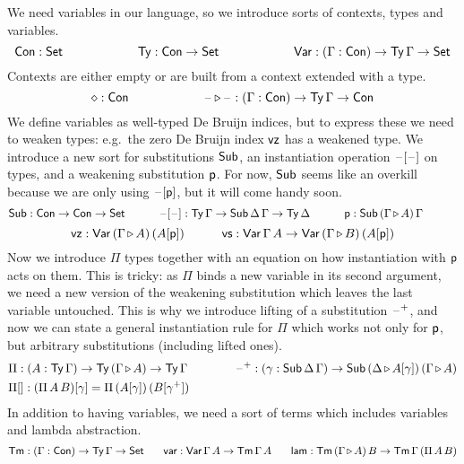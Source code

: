 \documentclass{easychair}
\begin{document}
We need variables in our language, so we introduce sorts of contexts,
types and variables.
\[
 \mathsf{Con} : \mathsf{Set} \hspace{6em} \mathsf{Ty} : \mathsf{Con}\rightarrow\mathsf{Set} \hspace{6em} \mathsf{Var} : (\Gamma:\mathsf{Con})\rightarrow\mathsf{Ty}\,\Gamma\rightarrow\mathsf{Set}  \\
\]
Contexts are either empty or are built from a context extended with a
type.
\[
\diamond : \mathsf{Con} \hspace{6em} \mathord{\hspace{1pt}\text{--}\hspace{1pt}}\mathop{\triangleright}\mathord{\hspace{1pt}\text{--}\hspace{1pt}} : (\Gamma:\mathsf{Con})\rightarrow\mathsf{Ty}\,\Gamma\rightarrow\mathsf{Con}
\]
We define variables as well-typed De Bruijn indices, but to express
these we need to weaken types: e.g.\ the zero De Bruijn index $\mathsf{vz}$
has a weakened type. We introduce a new sort for substitutions $\mathsf{Sub}$,
an instantiation operation $\mathord{\hspace{1pt}\text{--}\hspace{1pt}}[\mathord{\hspace{1pt}\text{--}\hspace{1pt}}]$ on types, and a weakening
substitution $\mathsf{p}$. For now, $\mathsf{Sub}$ seems like an overkill because we
are only using $\mathord{\hspace{1pt}\text{--}\hspace{1pt}}[\mathsf{p}]$, but it will come handy soon.
\[
\mathsf{Sub}: \mathsf{Con}\rightarrow\mathsf{Con}\rightarrow\mathsf{Set} \hspace{3em} \mathord{\hspace{1pt}\text{--}\hspace{1pt}}[\mathord{\hspace{1pt}\text{--}\hspace{1pt}}] : \mathsf{Ty}\,\Gamma\rightarrow\mathsf{Sub}\,\Delta\,\Gamma\rightarrow\mathsf{Ty}\,\Delta \hspace{3em} \mathsf{p} : \mathsf{Sub}\,(\Gamma\mathop{\triangleright} A)\,\Gamma \hspace{3em}
\]
\[
\mathsf{vz} : \mathsf{Var}\,(\Gamma\mathop{\triangleright} A)\,(A[\mathsf{p}]) \hspace{3em} \mathsf{vs} : \mathsf{Var}\,\Gamma\,A\rightarrow\mathsf{Var}\,(\Gamma\mathop{\triangleright} B)\,(A[\mathsf{p}])
\]
Now we introduce $\Pi$ types together with an equation on how
instantiation with $\mathsf{p}$ acts on them. This is tricky: as $\Pi$ binds a
new variable in its second argument, we need a new version of the
weakening substitution which leaves the last variable untouched. This
is why we introduce lifting of a substitution $\mathord{\hspace{1pt}\text{--}\hspace{1pt}}^{+}$, and now we
can state a general instantiation rule for $\Pi$ which works not only
for $\mathsf{p}$, but arbitrary substitutions (including lifted ones).
\begin{alignat*}{10}
& \Pi:(A:\Ty\,\Gamma)\ra\Ty\,(\Gamma\ext A)\ra\Ty\,\Gamma \hspace{3em} && \blank^+ : (\gamma:\Sub\,\Delta\,\Gamma)\ra\Sub\,(\Delta\ext A[\gamma])\,(\Gamma\ext A) \\
& \Pi[] : (\Pi\,A\,B)[\gamma] = \Pi\,(A[\gamma])\,(B[\gamma^+])
\end{alignat*}
In addition to having variables, we need a sort of terms which
includes variables and lambda abstraction.
\[
\mathsf{Tm} : (\Gamma:\mathsf{Con})\rightarrow\mathsf{Ty}\,\Gamma\rightarrow\mathsf{Set} \hspace{1.8em} \mathsf{var} : \mathsf{Var}\,\Gamma\,A\rightarrow\mathsf{Tm}\,\Gamma\,A \hspace{1.8em} \mathsf{lam} : \mathsf{Tm}\,(\Gamma\mathop{\triangleright} A)\,B\rightarrow\mathsf{Tm}\,\Gamma\,(\Pi\,A\,B)  \\
\]
\end{document}
